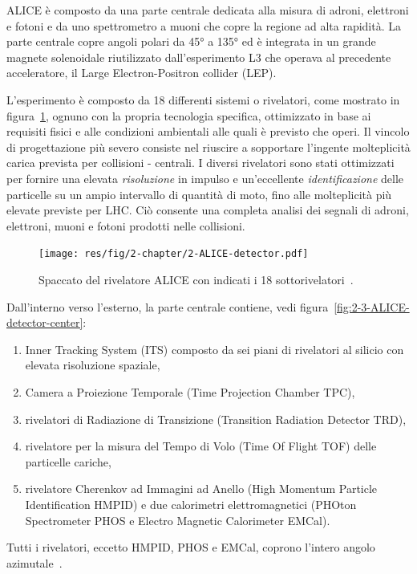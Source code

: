     ALICE è composto da una parte centrale dedicata alla misura di adroni, elettroni e fotoni e da uno spettrometro a muoni che copre la regione ad alta rapidità. La parte centrale copre angoli polari da \ang{45} a \ang{135} ed è integrata in un grande magnete solenoidale riutilizzato dall’esperimento L3 che operava al precedente acceleratore, il Large Electron-Positron collider (LEP).
    
    L’esperimento è composto da 18 differenti sistemi o rivelatori, come mostrato in figura~\ref{fig:2-2-ALICE-detector}, ognuno con la propria tecnologia specifica, ottimizzato in base ai requisiti fisici e alle condizioni ambientali alle quali è previsto che operi. Il vincolo di progettazione più severo consiste nel riuscire a sopportare l’ingente molteplicità carica prevista per collisioni - centrali. I diversi rivelatori sono stati ottimizzati per fornire una elevata \textit{risoluzione} in impulso e un’eccellente \textit{identificazione} delle particelle su un ampio intervallo di quantità di moto, fino alle molteplicità più elevate previste per LHC. Ciò consente una completa analisi dei segnali di adroni, elettroni, muoni e fotoni prodotti nelle collisioni.

    \begin{figure}[t]
        \centering
        \texttt{[image: res/fig/2-chapter/2-ALICE-detector.pdf]}
        \caption{Spaccato del rivelatore ALICE con indicati i 18 sottorivelatori~\cite{Tauro_2017}.}
        \label{fig:2-2-ALICE-detector}
    \end{figure}
    
    Dall’interno verso l’esterno, la parte centrale contiene, vedi figura~\ref{fig:2-3-ALICE-detector-center}:
    \begin{enumerate}
        \item Inner Tracking System (ITS) composto da sei piani di rivelatori al silicio con elevata risoluzione spaziale,

        \item Camera a Proiezione Temporale (Time Projection Chamber TPC),
        
        \item rivelatori di Radiazione di Transizione (Transition Radiation Detector TRD),

        \item rivelatore per la misura del Tempo di Volo (Time Of Flight TOF) delle particelle cariche,

        \item rivelatore Cherenkov ad Immagini ad Anello (High Momentum Particle Identification HMPID) e due calorimetri elettromagnetici (PHOton Spectrometer PHOS e Electro Magnetic Calorimeter EMCal).
    \end{enumerate}
    Tutti i rivelatori, eccetto HMPID, PHOS e EMCal, coprono l’intero angolo azimutale~\cite{ALICE_2008}.

